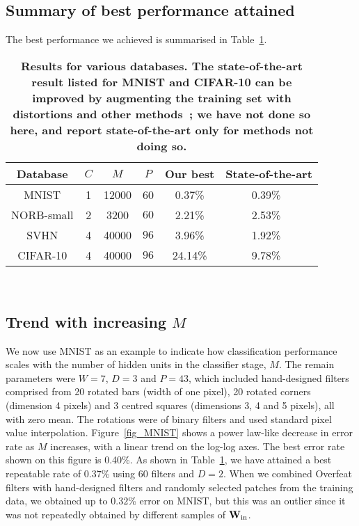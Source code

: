 \documentclass[conference]{IEEEtran}
\begin{document}
\subsection{Summary of best performance attained}

The best performance we achieved is summarised in Table~\ref{Table4}. 

\begin{table}[!ht]
{\footnotesize
\begin{tabular}{|c|c|c|c|c|c|}
\hline
Database  & $C$ & $M$ & $P$& Our best & State-of-the-art\\
\hline
MNIST & 1& 12000  & 60 & 0.37\% & 0.39\%~\cite{Mairal.14,Lee.14}\\
NORB-small & 2&  3200 & $60$ & 2.21\% & 2.53\%~\cite{Ciresan.11}\\
SVHN  &  4& 40000 & $96$ & 3.96\%& 1.92\%~\cite{Lee.14}\\
CIFAR-10 &   4& 40000 & $96$ & 24.14\% & 9.78\%~\cite{Lee.14}\\ 
\hline
\end{tabular}
~\\
\caption{\bf{Results for various databases. The state-of-the-art result listed for MNIST and CIFAR-10 can be improved by augmenting the training set with distortions and other methods~\cite{Simard.03,Ciresan.10,Ciresan.12}; we have not done so here, and report state-of-the-art only for methods not doing so.}}\label{Table4}
}
\end{table}

\subsection{Trend with increasing $M$}

We now use MNIST as an example to indicate how classification performance scales with the number of hidden units in the classifier stage, $M$. The remain parameters were $W=7$, $D=3$ and $P=43$, which included hand-designed filters comprised from 20 rotated bars (width of one pixel), 20 rotated corners (dimension 4 pixels) and 3 centred squares (dimensions 3, 4 and 5 pixels), all with  zero mean. The rotations were of binary filters and used standard pixel value interpolation. Figure~\ref{fig_MNIST} shows a power law-like decrease in error rate as $M$ increases, with a linear trend on the log-log axes. The best error rate shown on this figure is 0.40\%. As shown in Table~\ref{Table4}, we have attained a best repeatable rate of $0.37$\% using 60 filters and $D=2$. When we combined Overfeat filters with hand-designed filters and randomly selected patches from the training data, we obtained up to $0.32$\% error on MNIST, but this was an outlier since it was not repeatedly obtained by different samples of ${\bf W}_{\rm in}$.
\end{document}
